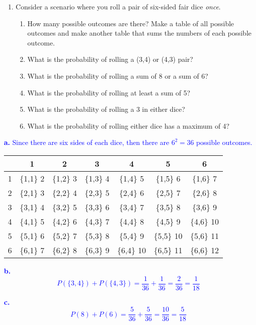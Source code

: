 \documentclass[
]{article}
\providecommand{\tightlist}{%
  \setlength{\itemsep}{0pt}\setlength{\parskip}{0pt}}
\begin{document}
\begin{enumerate}
\def\labelenumi{\arabic{enumi}.}
\item
  Consider a scenario where you roll a pair of six-sided fair dice \emph{once}.

  \begin{enumerate}
  \def\labelenumii{\alph{enumii}.}
  \tightlist
  \item
    How many possible outcomes are there? Make a table of all possible outcomes and make another table that sums the numbers of each possible outcome.
  \item
    What is the probability of rolling a (3,4) or (4,3) pair?
  \item
    What is the probability of rolling a sum of 8 or a sum of 6?
  \item
    What is the probability of rolling at least a sum of 5?
  \item
    What is the probability of rolling a 3 in either dice?
  \item
    What is the probability of rolling either dice has a maximum of 4?
  \end{enumerate}
\end{enumerate}

\textcolor{blue}{\textbf{a.} Since there are six sides of each dice, then there are $6^2 = 36$ possible outcomes.}

\begin{longtable}[]{@{}ccccccc@{}}
\toprule()
& 1 & 2 & 3 & 4 & 5 & 6 \\
\midrule()
\endhead
1 & \{1,1\} 2 & \{1,2\} 3 & \{1,3\} 4 & \{1,4\} 5 & \{1,5\} 6 & \{1,6\} 7 \\
2 & \{2,1\} 3 & \{2,2\} 4 & \{2,3\} 5 & \{2,4\} 6 & \{2,5\} 7 & \{2,6\} 8 \\
3 & \{3,1\} 4 & \{3,2\} 5 & \{3,3\} 6 & \{3,4\} 7 & \{3,5\} 8 & \{3,6\} 9 \\
4 & \{4,1\} 5 & \{4,2\} 6 & \{4,3\} 7 & \{4,4\} 8 & \{4,5\} 9 & \{4,6\} 10 \\
5 & \{5,1\} 6 & \{5,2\} 7 & \{5,3\} 8 & \{5,4\} 9 & \{5,5\} 10 & \{5,6\} 11 \\
6 & \{6,1\} 7 & \{6,2\} 8 & \{6,3\} 9 & \{6,4\} 10 & \{6,5\} 11 & \{6,6\} 12 \\
\bottomrule()
\end{longtable}

\textcolor{blue}{\textbf{b.} $$P(\{3,4\}) + P(\{4,3\}) = \frac{1}{36} + \frac{1}{36} = \frac{2}{36} = \frac{1}{18}$$}

\textcolor{blue}{\textbf{c.} $$P(8) + P(6) = \frac{5}{36} + \frac{5}{36} = \frac{10}{36} = \frac{5}{18}$$}
\end{document}
